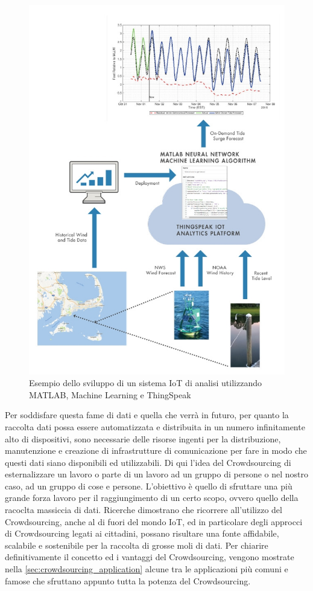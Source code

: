 \begin{figure}
	\begin{center}
		\includegraphics[width=0.5\columnwidth]{images/machine_learning_iot}
	\end{center}
	\caption{Esempio dello sviluppo di un sistema IoT di analisi utilizzando MATLAB, Machine Learning e ThingSpeak \cite{famous:matlab_machine_learning}}
	\label{fig:machine_learning_iot}
\end{figure}
Per soddisfare questa fame di dati e quella che verrà in futuro, per quanto la raccolta dati possa essere automatizzata e distribuita in un numero infinitamente alto di dispositivi, sono necessarie delle risorse ingenti per la distribuzione, manutenzione e creazione di infrastrutture di comunicazione per fare in modo che questi dati siano disponibili ed utilizzabili.
Di qui l'idea del Crowdsourcing di esternalizzare un lavoro o parte di un lavoro ad un gruppo di persone o nel nostro caso, ad un gruppo di cose e persone. L'obiettivo è quello di sfruttare una più grande forza lavoro per il raggiungimento di un certo scopo, ovvero quello della racoclta massiccia di dati. \cite{famous:paper_crowdsourcing_4}
Ricerche dimostrano che ricorrere all'utilizzo del Crowdsourcing, anche al di fuori del mondo IoT, ed in particolare degli approcci di Crowdsourcing legati ai cittadini, possano risultare una fonte affidabile, scalabile e sostenibile per la raccolta di grosse moli di dati. \cite{famous:paper_crowdsourcing_4}
Per chiarire definitivamente il concetto ed i vantaggi del Crowdsourcing, vengono mostrate nella \autoref{sec:crowdsourcing_application} alcune tra le applicazioni più comuni e famose che sfruttano appunto tutta la potenza del Crowdsourcing.

